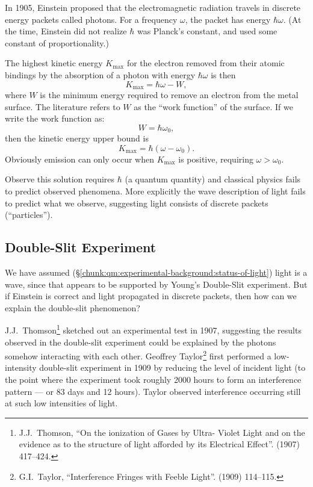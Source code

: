 In 1905, Einstein proposed that the electromagnetic radiation travels in
discrete energy packets called photons. For a frequency $\omega$, the
packet has energy $\hbar\omega$. (At the time, Einstein did not realize
$\hbar$ was Planck's constant, and used some constant of proportionality.)

The highest kinetic energy $K_{\text{max}}$ for the electron removed
from their atomic bindings by the absorption of a photon with energy
$\hbar\omega$ is then
\begin{equation}
K_{\text{max}} = \hbar\omega - W,
\end{equation}
where $W$ is the minimum energy required to remove an electron from the
metal surface. The literature refers to $W$ as the ``work function'' of
the surface. If we write the work function as:
\begin{equation}
W = \hbar\omega_{0},
\end{equation}
then the kinetic energy upper bound is
\begin{equation}
K_{\text{max}} = \hbar(\omega - \omega_{0}).
\end{equation}
Obviously emission can only occur when $K_{\text{max}}$ is positive,
requiring $\omega>\omega_{0}$.

Observe this solution requires $\hbar$ (a quantum quantity) and
classical physics fails to predict observed phenomena. More explicitly
the wave description of light fails to predict what we observe,
suggesting light consists of discrete packets (``particles'').

\subsection{Double-Slit Experiment}

We have assumed (\S\ref{chunk:qm:experimental-background:status-of-light})
light is a wave, since that appears to be supported by Young's
Double-Slit experiment. But if Einstein is correct and light propagated
in discrete packets, then how can we explain the double-slit phenomenon?

J.J.~Thomson\footnote{J.J.~Thomson, ``On the ionization of Gases by
Ultra- Violet Light and on the evidence as to the structure of light
afforded by its Electrical Effect''. 
 (1907) 417--424.} sketched out an experimental test in 1907, 
suggesting the results observed in the double-slit experiment could be
explained by the photons somehow interacting with each other.
Geoffrey Taylor\footnote{G.I.~Taylor, ``Interference Fringes with Feeble
Light''.   (1909) 114--115.}
first performed a low-intensity double-slit experiment
in 1909 by reducing the level of incident light (to the point where the
experiment took roughly 2000 hours to form an interference pattern ---
or 83 days and 12 hours). Taylor observed interference occurring still
at such low intensities of light.

